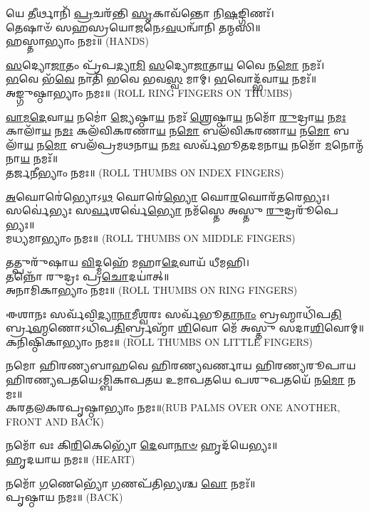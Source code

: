  𑌯𑍇 \ul{𑌤𑍀}\-𑌰𑍍𑌥𑌾𑌨𑌿᳴ \ul{𑌪𑍍𑌰}\-𑌚𑌰᳴𑌨𑍍𑌤𑌿 \ul{𑌸𑍃}\-𑌕𑌾𑌵᳴𑌨𑍍𑌤𑍋 𑌨𑌿\-\ul{𑌷}\-𑌙𑍍𑌗𑌿𑌣𑌃᳴।\\
 𑌤𑍇𑌷𑌾𑍞᳴ 𑌸𑌹𑌸𑍍𑌰𑌯𑍋\-\ul{𑌜}\-𑌨𑍇𑌽\-\ul{𑌵}\-𑌧𑌨𑍍𑌵𑌾᳴𑌨𑌿 𑌤𑌨𑍍𑌮𑌸𑌿॥\\
𑌹𑌸𑍍𑌤𑌾𑌭𑍍𑌯𑌾𑌂 𑌨𑌮𑌃॥ {\scriptsize (HANDS)}


\-\ul{𑌸}\-𑌦𑍍𑌯𑍋\-\ul{𑌜𑌾}\-𑌤𑌂 𑌪𑍍𑌰᳴𑌪\-\ul{𑌦𑍍𑌯𑌾}\-\-\ul{𑌮𑌿} \ul{𑌸}\-𑌦𑍍𑌯𑍋\-\ul{𑌜𑌾}\-𑌤𑌾\-\ul{𑌯} 𑌵𑍈 𑌨\-\ul{𑌮𑍋} 𑌨𑌮𑌃᳴।\\
\-\ul{𑌭}\-𑌵𑍇 𑌭᳴\-\ul{𑌵𑍇} 𑌨𑌾𑌤𑌿᳴ 𑌭𑌵𑍇 𑌭𑌵\-\ul{𑌸𑍍𑌵} 𑌮𑌾𑌮𑍍। \ul{𑌭}\-𑌵𑍋𑌦𑍍𑌭᳴𑌵𑌾\-\ul{𑌯} 𑌨𑌮𑌃᳴॥ \\
𑌅𑌙𑍍𑌗𑍁𑌷𑍍𑌠𑌾𑌭𑍍𑌯𑌾𑌂 𑌨𑌮𑌃॥ {\scriptsize (ROLL RING FINGERS ON THUMBS)}

\-\ul{𑌵𑌾}\-\-\ul{𑌮}\-\-\ul{𑌦𑍇}\-𑌵𑌾\-\ul{𑌯} 𑌨𑌮𑍋॑ \ul{𑌜𑍍𑌯𑍇}\-𑌷𑍍𑌠𑌾\-\ul{𑌯} 𑌨𑌮𑌃᳴ \ul{𑌶𑍍𑌰𑍇}\-𑌷𑍍𑌠𑌾\-\ul{𑌯} 𑌨𑌮𑍋᳴ \ul{𑌰𑍁}\-𑌦𑍍𑌰𑌾\-\ul{𑌯} 𑌨\-\ul{𑌮𑌃} 𑌕𑌾𑌲𑌾᳴\-\ul{𑌯} 𑌨\-\ul{𑌮𑌃} 𑌕𑌲᳴𑌵𑌿𑌕𑌰𑌣𑌾\-\ul{𑌯} 𑌨\-\ul{𑌮𑍋} 𑌬𑌲᳴𑌵𑌿𑌕𑌰𑌣𑌾\-\ul{𑌯} 𑌨\-\ul{𑌮𑍋} 𑌬𑌲𑌾᳴\-\ul{𑌯} 𑌨\-\ul{𑌮𑍋} 𑌬𑌲᳴𑌪𑍍𑌰𑌮𑌥𑌨𑌾\-\ul{𑌯} 𑌨\-\ul{𑌮𑌃} 𑌸𑌰𑍍𑌵᳴𑌭𑍂𑌤𑌦𑌮𑌨𑌾\-\ul{𑌯} 𑌨𑌮𑍋᳴ \ul{𑌮}\-𑌨𑍋𑌨𑍍𑌮᳴𑌨𑌾\-\ul{𑌯} 𑌨𑌮𑌃᳴॥\\
𑌤𑌰𑍍𑌜𑌨𑍀𑌭𑍍𑌯𑌾𑌂 𑌨𑌮𑌃॥ {\scriptsize (ROLL THUMBS ON INDEX FINGERS)}

\-\ul{𑌅}\-𑌘𑍋𑌰𑍇॑𑌭𑍍𑌯𑍋𑌽\-\ul{𑌥} 𑌘𑍋𑌰𑍇॑\-\ul{𑌭𑍍𑌯𑍋} 𑌘𑍋\-\ul{𑌰}\-𑌘𑍋𑌰᳴𑌤𑌰𑍇𑌭𑍍𑌯𑌃।\\
𑌸𑌰𑍍𑌵𑍇॑𑌭𑍍𑌯𑌃 𑌸\-\ul{𑌰𑍍𑌵}\-𑌶𑌰𑍍𑌵𑍇॑\-\ul{𑌭𑍍𑌯𑍋} 𑌨𑌮᳴𑌸𑍍𑌤𑍇 𑌅𑌸𑍍𑌤𑍁 \ul{𑌰𑍁}\-𑌦𑍍𑌰𑌰𑍂᳴𑌪𑍇𑌭𑍍𑌯𑌃॥\\
𑌮𑌧𑍍𑌯𑌮𑌾𑌭𑍍𑌯𑌾𑌂 𑌨𑌮𑌃॥ {\scriptsize (ROLL THUMBS ON MIDDLE FINGERS)}

𑌤𑌤𑍍𑌪𑍁𑌰𑍁᳴𑌷𑌾𑌯 \ul{𑌵𑌿}\-𑌦𑍍𑌮𑌹𑍇᳴ 𑌮𑌹𑌾\-\ul{𑌦𑍇}\-𑌵𑌾𑌯᳴ 𑌧𑍀𑌮𑌹𑌿।\\
𑌤𑌨𑍍𑌨𑍋᳴ 𑌰𑍁𑌦𑍍𑌰𑌃 𑌪𑍍𑌰\-\ul{𑌚𑍋}\-𑌦𑌯𑌾॑𑌤𑍍॥\\
𑌅𑌨𑌾𑌮𑌿𑌕𑌾𑌭𑍍𑌯𑌾𑌂 𑌨𑌮𑌃॥ {\scriptsize (ROLL THUMBS ON RING FINGERS)}

𑌈𑌶𑌾𑌨𑌃 𑌸𑌰𑍍𑌵᳴𑌵𑌿\-\ul{𑌦𑍍𑌯𑌾}\-\-\ul{𑌨𑌾}\-𑌮𑍀𑌶𑍍𑌵𑌰𑌃 𑌸𑌰𑍍𑌵᳴𑌭𑍂\-\ul{𑌤𑌾}\-\-\ul{𑌨𑌾𑌂} 𑌬𑍍𑌰𑌹𑍍𑌮𑌾𑌧𑌿᳴𑌪\-\ul{𑌤𑌿}\-𑌰𑍍𑌬𑍍𑌰\-\ul{𑌹𑍍𑌮}\-𑌣𑍋\-𑌽𑌧𑌿᳴𑌪\-\ul{𑌤𑌿}\-𑌰𑍍𑌬𑍍𑌰𑌹𑍍𑌮𑌾᳴ \ul{𑌶𑌿}\-𑌵𑍋 𑌮𑍇᳴ 𑌅𑌸𑍍𑌤𑍁 𑌸𑌦𑌾\-\ul{𑌶𑌿}\-𑌵𑍋𑌮𑍍॥\\
𑌕𑌨𑌿𑌷𑍍𑌠𑌿𑌕𑌾𑌭𑍍𑌯𑌾𑌂 𑌨𑌮𑌃॥ {\scriptsize (ROLL THUMBS ON LITTLE FINGERS)}

𑌨𑌮𑍋 𑌹𑌿𑌰𑌣𑍍𑌯𑌬𑌾𑌹𑌵𑍇 𑌹𑌿𑌰𑌣𑍍𑌯𑌵𑌰𑍍𑌣𑌾𑌯 𑌹𑌿𑌰𑌣𑍍𑌯𑌰𑍂𑌪𑌾𑌯 𑌹𑌿𑌰𑌣𑍍𑌯𑌪𑌤𑌯𑍇\-𑌽𑌮𑍍𑌬𑌿𑌕𑌾𑌪𑌤𑌯 𑌉𑌮𑌾𑌪𑌤𑌯𑍇 𑌪𑌶𑍁𑌪𑌤𑌯𑍇᳴ 𑌨\-\ul{𑌮𑍋} 𑌨𑌮𑌃॥\\
𑌕𑌰𑌤𑌲𑌕𑌰𑌪𑍃𑌷𑍍𑌠𑌾𑌭𑍍𑌯𑌾𑌂 𑌨𑌮𑌃॥{\scriptsize (RUB PALMS OVER ONE ANOTHER, FRONT AND BACK)}

𑌨𑌮𑍋᳴ 𑌵𑌃 𑌕𑌿\-\ul{𑌰𑌿}\-𑌕𑍇𑌭𑍍𑌯𑍋᳴ \ul{𑌦𑍇}\-𑌵𑌾\-\ul{𑌨𑌾}\-\-\ul{𑍞} 𑌹𑍃𑌦᳴𑌯𑍇𑌭𑍍𑌯𑌃॥\\
𑌹𑍃𑌦𑌯𑌾𑌯 𑌨𑌮𑌃॥ {\scriptsize (HEART)}

𑌨𑌮𑍋᳴ \ul{𑌗}\-𑌣𑍇𑌭𑍍𑌯𑍋᳴ \ul{𑌗}\-𑌣𑌪᳴𑌤𑌿𑌭𑍍𑌯𑌶𑍍𑌚 \ul{𑌵𑍋} 𑌨𑌮𑌃᳴॥\\
𑌪𑍃𑌷𑍍𑌠𑌾𑌯 𑌨𑌮𑌃॥ {\scriptsize (BACK)}


